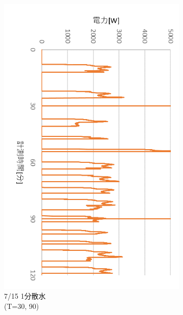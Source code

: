\documentclass[a4j,fleqn,dvipdfmx,uplatex]{jsarticle}
\begin{document}
\begin{figure}[htb]
\begin{subfigure}[t]{0.32\linewidth}
    \includegraphics[width=\linewidth]{img/0715_power.png}
    \caption{7/15 1分散水\\(T=30, 90)}\label{fig:b}
  \end{subfigure}
  \begin{subfigure}[t]{0.32\linewidth}
    \centering

\end{subfigure}
\end{figure}
\end{document}
